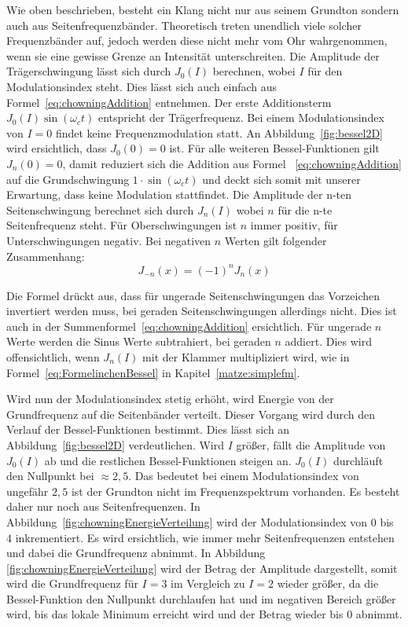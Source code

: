 Wie oben beschrieben, besteht ein Klang nicht nur aus seinem Grundton sondern auch aus Seitenfrequenzbänder. Theoretisch treten unendlich viele solcher Frequenzbänder auf, jedoch werden diese nicht mehr vom Ohr wahrgenommen, wenn sie eine gewisse Grenze an Intensität unterschreiten. \cite[S. 221]{lathi}
Die Amplitude der Trägerschwingung lässt sich durch $J_0(I)$ berechnen, wobei $I$ für den Modulationsindex steht. Dies lässt sich auch einfach aus Formel~\ref{eq:chowningAddition} entnehmen. Der erste Additionsterm $J_0(I)\sin(\omega_c t)$ entspricht der Trägerfrequenz. Bei einem Modulationsindex von $I=0$ findet keine Frequenzmodulation statt. An Abbildung~\ref{fig:bessel2D} wird ersichtlich, dass $J_0(0)=0$ ist. Für alle weiteren Bessel-Funktionen gilt $J_n(0)=0$, damit reduziert sich die Addition aus Formel~ \ref{eq:chowningAddition} auf die Grundschwingung $1\cdot\sin(\omega_c t)$ und deckt sich somit mit unserer Erwartung, dass keine Modulation stattfindet. Die Amplitude der n-ten Seitenschwingung berechnet sich durch $J_n(I)$ wobei $n$ für die n-te Seitenfrequenz steht. Für Oberschwingungen ist $n$ immer positiv, für Unterschwingungen negativ. Bei negativen $n$ Werten gilt folgender Zusammenhang: \cite[S. 223]{temme}
\begin{equation*}
J_{-n}(x)=(-1)^nJ_n(x)
\end{equation*}

Die Formel drückt aus, dass für ungerade Seitenschwingungen das Vorzeichen invertiert werden muss, bei geraden Seitenschwingungen allerdings nicht. Dies ist auch in der Summenformel~\ref{eq:chowningAddition} ersichtlich. Für ungerade $n$ Werte werden die Sinus Werte subtrahiert, bei geraden $n$ addiert. 
Dies wird offensichtlich, wenn $J_n(I)$ mit der Klammer multipliziert wird, wie in Formel~\ref{eq:FormelinchenBessel} in Kapitel~\ref{matze:simplefm}.

\label{bulli:besselModIndexZusammenahang}
Wird nun der Modulationsindex stetig erhöht, wird Energie von der Grundfrequenz auf die Seitenbänder verteilt. Dieser Vorgang wird durch den Verlauf der Bessel-Funktionen bestimmt. Dies lässt sich an Abbildung~\ref{fig:bessel2D} verdeutlichen. Wird $I$ größer, fällt die Amplitude von $J_0(I)$ ab und die restlichen Bessel-Funktionen steigen an. $J_0(I)$ durchläuft den Nullpunkt bei $\approx2,5$. Das bedeutet bei einem Modulationsindex von ungefähr $2,5$ ist der Grundton nicht im Frequenzspektrum vorhanden. Es besteht daher nur noch aus Seitenfrequenzen. In Abbildung~\ref{fig:chowningEnergieVerteilung} wird der Modulationsindex von $0$ bis $4$ inkrementiert.
Es wird ersichtlich, wie immer mehr Seitenfrequenzen entstehen und dabei die Grundfrequenz abnimmt. In Abbildung~ \ref{fig:chowningEnergieVerteilung} wird der Betrag der Amplitude dargestellt, somit wird die Grundfrequenz für $I=3$ im Vergleich zu $I=2$ wieder größer, da die Bessel-Funktion den Nullpunkt durchlaufen hat und im negativen Bereich größer wird, bis das lokale Minimum erreicht wird und der Betrag wieder bis $0$ abnimmt.

